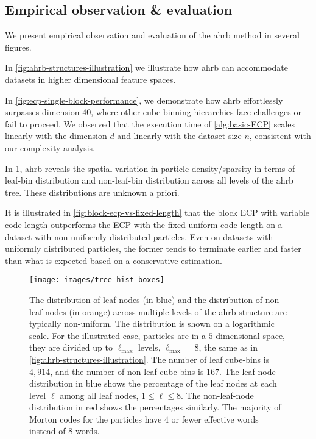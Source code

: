 \documentclass[final]{juliacon}
\begin{document}
\subsection{Empirical observation \& evaluation}
\label{sec:empirical-evaluation}

%
%
%
%
%

We present empirical observation and evaluation of the {\sc ahrb}
method in several figures.
%
\begin{inparaenum}[(a)]
%
\item In \cref{fig:ahrb-structures-illustration} we illustrate how
{\sc ahrb} can accommodate datasets in higher dimensional
feature spaces.
%
\item In \cref{fig:ecp-single-block-performance}, we demonstrate how
  {\sc ahrb} effortlessly surpasses dimension $40$, where other
  cube-binning hierarchies face challenges or fail to proceed. We
  observed that the execution time of \cref{alg:basic-ECP} scales
  linearly with the dimension $d$ and linearly with the dataset size
  $n$, consistent with our complexity analysis.
\item In \cref{fig:node-distributions-on-ahrb}, {\sc ahrb} reveals the
  spatial variation in particle density/sparsity in terms of leaf-bin
  distribution and non-leaf-bin distribution across all levels of the
  {\sc ahrb} tree. These distributions are unknown a priori.
\item It is illustrated in \cref{fig:block-ecp-vs-fixed-length} that the block ECP with
  variable code length outperforms the ECP with the fixed uniform code
  length on a dataset with non-uniformly distributed particles. Even
  on datasets with uniformly distributed particles, the former tends
  to terminate earlier and faster than what is expected based on a
  conservative estimation.
\end{inparaenum}


%
\vspace{6pt}
%
%
%
%
%
\begin{figure}
  \texttt{[image: images/tree\_hist\_boxes]}
  \caption{%
    The distribution of leaf nodes (in blue) and the distribution of non-leaf
    nodes (in orange) across multiple levels of the {\sc ahrb} structure are
    typically non-uniform. The distribution is shown on a logarithmic scale. For
    the illustrated case, particles are in a $5$-dimensional space, they are
    divided up to $\ell_{\max}$ levels, $\ell_{\max} = 8$, the same as in
    \cref{fig:ahrb-structures-illustration}.
    The number of leaf cube-bins is $4{,}914$, and 
    the number of non-leaf cube-bins is $167$.
    The leaf-node distribution in blue shows the percentage of the
    leaf nodes at each level $\ell$ among all leaf nodes,
    $1\leq \ell\leq 8$. The non-leaf-node distribution in red
    shows the percentages similarly.
    The majority of Morton codes for the particles
    have $4$ or fewer effective words instead of $8$ words.
  }
  \label{fig:node-distributions-on-ahrb}
\end{figure} %
\end{document}

